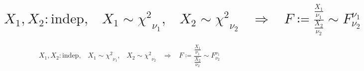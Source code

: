     \section{\texorpdfstring{$X_1,X_2 : \text{indep},\;\;\;X_1 \sim {\chi^2}_{\nu_1},\;\;\;X_2 \sim {\chi^2}_{\nu_2} \hspace{10pt} \Rightarrow \hspace{10pt} F\coloneqq \frac{\frac{X_1}{\nu_1}}{\frac{X_2}{\nu_2}} \sim F_{\nu_2}^{\nu_1}$}{X1,X2: 独立, X1～χ\string^2\_ν1, X2～χ\string^2\_ν2 ⇒ F := (X1/ν1)/(X2/ν2) ～ F\_ν2\string^ν1}}
        \begin{shadebox}
            \[X_1,X_2 : \text{indep},\;\;\;X_1 \sim {\chi^2}_{\nu_1},\;\;\;X_2 \sim {\chi^2}_{\nu_2} \hspace{10pt} \Rightarrow \hspace{10pt} F\coloneqq \frac{\frac{X_1}{\nu_1}}{\frac{X_2}{\nu_2}} \sim F_{\nu_2}^{\nu_1}\]
        \end{shadebox}
